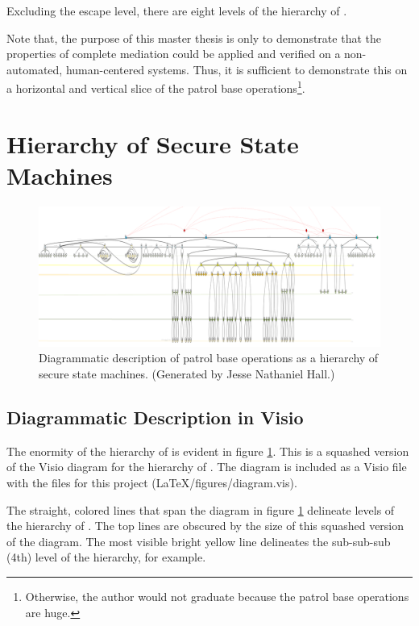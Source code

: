\documentclass[../../main/main.tex]{subfiles}
\begin{document}
Excluding the escape level, there are eight levels of the hierarchy of .

Note that, the purpose of this master thesis is only to demonstrate that the properties of complete mediation could be applied and verified on a non-automated, human-centered systems. Thus, it is sufficient to demonstrate this on a horizontal and vertical slice of the patrol base operations\footnote{Otherwise, the author would not graduate because the patrol base operations are huge.  }.  

\section{Hierarchy of Secure State Machines}
\begin{figure}[h]
\includegraphics[width=\textwidth]{../figures/overalldiagramsquashed}
\caption{\label{overalldiagramsquashed}Diagrammatic description of patrol base operations as a hierarchy of secure state machines.  (Generated by Jesse Nathaniel Hall.)}
\end{figure}

\subsection{Diagrammatic Description in Visio}\label{ssec:overalldiagram}
The enormity of the hierarchy of  is evident in figure \ref{overalldiagramsquashed}.  This is a squashed version of the Visio diagram for the hierarchy of . The diagram is included as a Visio file with the files for this project (LaTeX/figures/diagram.vis).  



The straight, colored lines that span the diagram in figure \ref{overalldiagramsquashed} delineate levels of the hierarchy of .  The top lines are obscured by the size of this squashed version of the diagram.  The most visible bright yellow line delineates the sub-sub-sub (4th) level of the hierarchy, for example.
\end{document}
